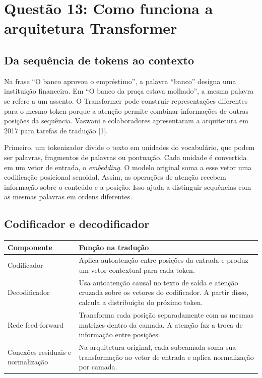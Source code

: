 \documentclass[12pt,a4paper]{article}
\begin{document}
\section{Questão 13: Como funciona a arquitetura Transformer}

\subsection{Da sequência de tokens ao contexto}

Na frase ``O banco aprovou o empréstimo'', a palavra ``banco'' designa uma instituição financeira. Em ``O banco da praça estava molhado'', a mesma palavra se refere a um assento. O Transformer pode construir representações diferentes para o mesmo token porque a atenção permite combinar informações de outras posições da sequência. Vaswani e colaboradores apresentaram a arquitetura em 2017 para tarefas de tradução [1].

Primeiro, um tokenizador divide o texto em unidades do vocabulário, que podem ser palavras, fragmentos de palavras ou pontuação. Cada unidade é convertida em um vetor de entrada, o \textit{embedding}. O modelo original soma a esse vetor uma codificação posicional senoidal. Assim, as operações de atenção recebem informação sobre o conteúdo e a posição. Isso ajuda a distinguir sequências com as mesmas palavras em ordens diferentes.

\subsection{Codificador e decodificador}

\begin{table}[htbp]
    \centering
    \begin{tabular}{>{\raggedright\arraybackslash}p{4.3cm} >{\raggedright\arraybackslash}p{10.5cm}}
        \toprule
        \textbf{Componente} & \textbf{Função na tradução} \\
        \midrule
        Codificador & Aplica autoatenção entre posições da entrada e produz um vetor contextual para cada token. \\
        \addlinespace
        Decodificador & Usa autoatenção causal no texto de saída e atenção cruzada sobre os vetores do codificador. A partir disso, calcula a distribuição do próximo token. \\
        \addlinespace
        Rede feed-forward & Transforma cada posição separadamente com as mesmas matrizes dentro da camada. A atenção faz a troca de informação entre posições. \\
        \addlinespace
        Conexões residuais e normalização & Na arquitetura original, cada subcamada soma sua transformação ao vetor de entrada e aplica normalização por camada. \\
        \bottomrule
    \end{tabular}
\end{table}
\end{document}
